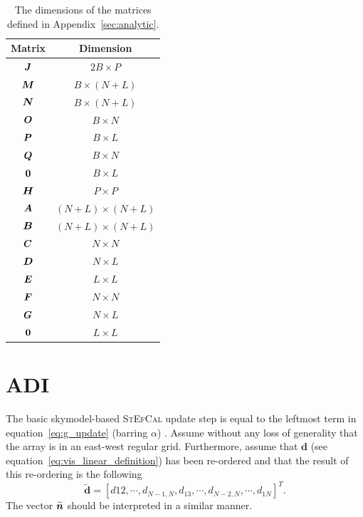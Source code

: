 \documentclass[useAMS,usenatbib]{mn2e}
\newcommand{\bA}{\bmath{A}}
\newcommand{\bB}{\bmath{B}}
\newcommand{\bC}{\bmath{C}}
\newcommand{\bE}{\bmath{E}}
\newcommand{\bF}{\bmath{F}}
\newcommand{\bG}{\bmath{G}}
\newcommand{\bn}{\bmath{n}}
\newcommand{\bJ}{\bmath{J}}
\newcommand{\bD}{\bmath{D}}
\newcommand{\bH}{\bmath{H}}
\newcommand{\bN}{\bmath{N}}
\newcommand{\bM}{\bmath{M}}
\newcommand{\bO}{\bmath{O}}
\newcommand{\bP}{\bmath{P}}
\newcommand{\bQ}{\bmath{Q}}
\newcommand{\bzero}{\bmath{0}}
\begin{document}
\begin{table}
\centering
\caption{The dimensions of the matrices defined in Appendix~\ref{sec:analytic}.}
\begin{tabular}{|c c|} 
\hline
Matrix & Dimension\\
\hline
\hline
$\bJ$ & $2B \times P$ \\
$\bM$ & $B \times (N+L)$ \\
$\bN$ & $B \times (N+L)$ \\
$\bO$ & $B \times N$ \\
$\bP$ & $B \times L$ \\
$\bQ$ & $B \times N$ \\
$\bzero$ & $B \times L$ \\
\hline
\hline
$\bH$ & $P\times P$\\
$\bA$ & $(N+L)\times (N+L)$\\
$\bB$ & $(N+L)\times (N+L)$\\
$\bC$ & $N \times N$\\
$\bD$ & $N \times L$\\
$\bE$ & $L \times L$\\
$\bF$ & $N \times N$\\
$\bG$ & $N \times L$\\
$\bzero$ & $L \times L$\\
\hline
\end{tabular}
\label{tab:matrix_dimensions}
\end{table}

\section{ADI}
\label{sec:red_stef_ADI}
The basic skymodel-based \textsc{StEfCal} update step is equal to  the leftmost term in equation~\ref{eq:g_update} (barring $\alpha$) \citep{Salvini2014}.
Assume without any loss of generality that the array is in an east-west regular grid. Furthermore, assume that $\boldsymbol{d}$ (see equation~\ref{eq:vis_linear_definition}) has been re-ordered 
and that the result of this re-ordering is the following
\begin{equation}
\widetilde{\boldsymbol{d}} = \left[d{12},\cdots,d_{N-1,N},d_{13},\cdots,d_{N-2,N},\cdots,d_{1N}\right]^T .
\end{equation}
The vector $\widetilde{\bn}$ should be interpreted in a similar manner.
\end{document}
